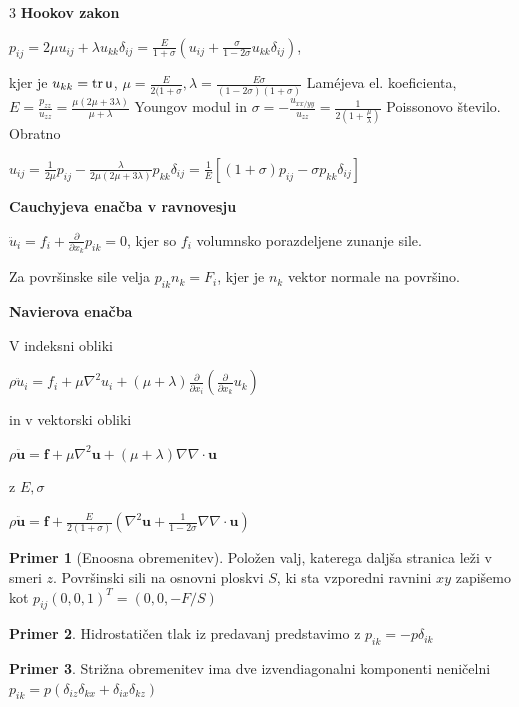 \documentclass[10pt,landscape]{article}
\theoremstyle{definition}
\newtheorem*{primer}{Primer}
\begin{document}
\begin{multicols}{3}
  \textbf{Hookov zakon}

  \( p_{ij} = 2\mu u_{ij} + \lambda u_{kk} \delta_{ij} = \frac{E}{1 + \sigma} \left( u_{ij} + \frac{\sigma}{1 - 2\sigma} u_{kk} \delta_{ij} \right) \),

  kjer je \( u_{kk} = \tr \mathsf{u} \), \( \mu = \frac{E}{2 (1 + \sigma}, \lambda = \frac{E \sigma}{(1 - 2 \sigma) (1 + \sigma)} \) Laméjeva el. koeficienta, \( E = \frac{p_{zz}}{u_{zz}} = \frac{\mu \left( 2 \mu + 3 \lambda \right)}{\mu + \lambda} \) Youngov modul in \( \sigma = - \frac{u_{xx/yy}}{u_{zz}} = \frac{1}{2(1 + \frac{\mu}{\lambda})} \) Poissonovo število. Obratno

  \( u_{ij} = \frac{1}{2\mu} p_{ij} - \frac{\lambda}{2 \mu \left( 2\mu + 3 \lambda \right)} p_{kk} \delta_{ij} = \frac{1}{E} \left[ \left( 1+ \sigma \right) p_{ij} - \sigma p_{kk} \delta_{ij} \right] \)

  \textbf{Cauchyjeva enačba v ravnovesju}

  \( \ddot{u}_i = f_i + \frac{\partial }{\partial x_{k}} p_{ik} = 0 \), kjer so \( f_i \) volumnsko porazdeljene zunanje sile. 

  Za površinske sile velja \( p_{ik}  n_k = F_i \), kjer je \( n_k \) vektor normale na površino.

  \textbf{Navierova enačba}

  V indeksni obliki

  \( \rho \ddot{u}_i = f_i + \mu \nabla ^2 u_i + \left( \mu + \lambda \right) \frac{\partial }{\partial x_{i}} \left( \frac{\partial }{\partial x_{k}} u_k \right) \)

  in v vektorski obliki

  \( \rho \ddot{\mathbf{u}} = \mathbf{f} + \mu \nabla ^2 \mathbf{u} + \left( \mu + \lambda \right) \nabla \nabla \cdot \mathbf{u} \)

  z \( E, \sigma \)

  \( \rho \ddot{\mathbf{u}} = \mathbf{f} + \frac{E}{2(1 + \sigma)} \left( \nabla ^2 \mathbf{u} + \frac{1}{1 - 2\sigma} \nabla \nabla \cdot \mathbf{u} \right) \)

  \begin{primer}[Enoosna obremenitev]
    Položen valj, katerega daljša stranica leži v smeri \( z \). Površinski sili na osnovni ploskvi \( S \), ki sta vzporedni ravnini \( xy \) zapišemo kot \( p_{ij} (0, 0, 1)^T = (0, 0, - F/S)  \)
  \end{primer}

  \begin{primer}
    Hidrostatičen tlak iz predavanj predstavimo z \( p_{ik} = - p \delta_{ik} \)
  \end{primer}
  \begin{primer}
    Strižna obremenitev ima dve izvendiagonalni komponenti neničelni \( p_{ik} = p (\delta_{iz} \delta_{kx} + \delta_{ix} \delta_{kz}) \)
  \end{primer}


\end{multicols}
\end{document}

